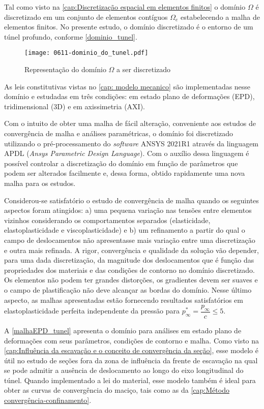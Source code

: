 Tal como visto na \autoref{cap:Discretização espacial em elementos finitos} o domínio $\Omega$ é discretizado em um conjunto de elementos contíguos $\Omega_e$ estabelecendo a malha de elementos finitos. No presente estudo, o domínio discretizado é o entorno de um túnel profundo, conforme \autoref{dominio_tunel}.
\begin{figure}[H]
	\begin{center}
		\texttt{[image: 0611-dominio\_do\_tunel.pdf]}
	\end{center}
	\caption{\label{dominio_tunel}Representação do domínio $\Omega$ a ser discretizado}
\end{figure}
As leis constitutivas vistas no \autoref{cap: modelo mecanico} são implementadas nesse domínio e estudadas em três condições: em estado plano de deformações (EPD), tridimensional (3D) e em axissimetria (AXI).

Com o intuito de obter uma malha de fácil alteração, conveniente aos estudos de convergência de malha e análises paramétricas, o domínio foi discretizado utilizando o pré-processamento do \textit{software} ANSYS 2021R1 através da linguagem APDL (\textit{Ansys Parametric Design Language}). Com o auxílio dessa linguagem é possível controlar a discretização do domínio em função de parâmetros que podem ser alterados facilmente e, dessa forma, obtido rapidamente uma nova malha para os estudos. 

Considerou-se satisfatório o estudo de convergência de malha quando os seguintes aspectos foram atingidos: a) uma pequena variação nas tensões entre elementos vizinhos considerando os comportamentos separados (elasticidade, elastoplasticidade e viscoplasticidade) e b) um refinamento a partir do qual o campo de deslocamentos não apresentasse mais variação entre uma discretização e outra mais refinada. A rigor, convergência e qualidade da solução vão depender, para uma dada discretização, da magnitude dos deslocamentos que é função das propriedades dos materiais e das condições de contorno no domínio discretizado. Os elementos não podem ter grandes distorções, os gradientes devem ser suaves e o campo de plastificação não deve alcançar as bordas do domínio. Nesse último aspecto, as malhas apresentadas estão fornecendo resultados satisfatórios em elastoplasticidade perfeita independente da pressão para $p_\infty^* = \dfrac{p_\infty}{c} \leq 5$.

A \autoref{malhaEPD_tunel} apresenta o domínio para análises em estado plano de deformações com seus parâmetros, condições de contorno e malha. Como visto na \autoref{cap:Influência da escavação e o conceito de convergência da seção}, esse modelo é útil no estudo de seções fora da zona de influência da frente de escavação na qual se pode admitir a ausência de deslocamento ao longo do eixo longitudinal do túnel. Quando implementado a lei do material, esse modelo também é ideal para obter as curvas de convergência do maciço, tais como as da \autoref{cap:Método convergência-confinamento}.

